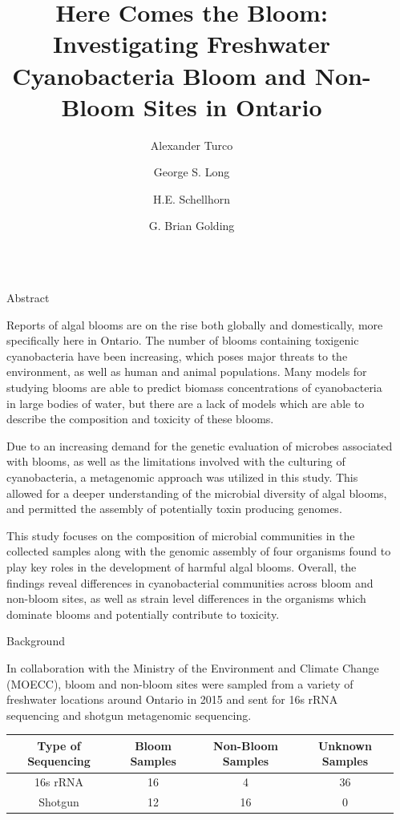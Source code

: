 \documentclass[final]{beamer}
\title{Here Comes the Bloom: Investigating Freshwater Cyanobacteria Bloom and Non-Bloom Sites in Ontario}
\author{Alexander Turco \inst{1} \and George S. Long \inst{1,2} \and H.E. Schellhorn \inst{1} \and G. Brian Golding \inst{1}}
\institute[shortinst]{\inst{1} Department of Biology, McMaster University, Ontario, Canada  \and %
                      \inst{2} McMaster aDNA Centre, McMaster University, Ontario, Canada }
\newlength{\sepwidth}
\newlength{\colwidth}
\newcommand{\separatorcolumn}{\begin{column}{\sepwidth}\end{column}}
\begin{document}
\begin{frame}[t]
\begin{columns}[t]
\separatorcolumn

\begin{column}{\colwidth}

  \begin{block}{Abstract}

    Reports of algal blooms are on the rise both globally and domestically, more specifically here in Ontario. 
    The number of blooms containing toxigenic cyanobacteria have been increasing, 
    which poses major threats to the environment, as well as human and animal populations. Many models
    for studying blooms are able to predict biomass concentrations of cyanobacteria in large bodies of water,
    but there are a lack of models which are able to describe the composition and toxicity of these blooms. 
    
    Due to an increasing demand for the genetic evaluation of microbes associated with blooms, as well as 
    the limitations involved with the culturing of cyanobacteria, a metagenomic approach was utilized in this study. 
    This allowed for a deeper understanding of the microbial diversity of algal blooms, and permitted
    the assembly of potentially toxin producing genomes.
    
    This study focuses on the composition of microbial communities in the collected
    samples along with the genomic assembly of four organisms found to play key roles in the development of harmful algal
    blooms. Overall, the findings reveal differences in cyanobacterial communities across bloom and non-bloom sites, as 
    well as strain level differences in the organisms which dominate blooms and potentially contribute to toxicity.
    
  \end{block}

  \begin{block}{Background}

    In collaboration with the Ministry of the Environment and Climate Change (MOECC), bloom and non-bloom sites
    were sampled from a variety of freshwater locations around Ontario in 2015 and sent for 16s rRNA sequencing 
    and shotgun metagenomic sequencing.
     
     \begin{table}[h]
	\centering
	\begin{tabular}{cccc}
	\toprule
	\textbf{Type of Sequencing} & \textbf{Bloom Samples} &\textbf{Non-Bloom Samples} & \textbf{Unknown Samples} \\
	\midrule
	16s rRNA & 16 & 4 & 36 \\ 
 	Shotgun & 12 & 16 & 0 \\ 
	\bottomrule
	\end{tabular}
      \end{table}
    

\end{block}
\end{column}
\end{columns}
\end{frame}
\end{document}
